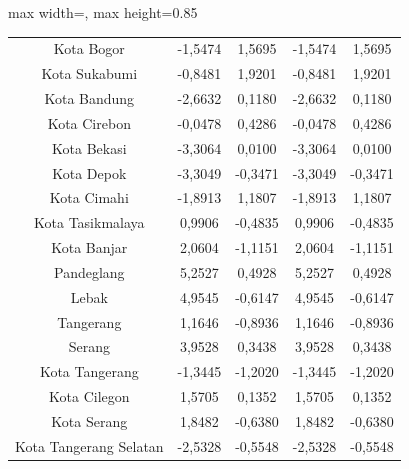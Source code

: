 \begin{table}[H]
\begin{adjustbox}{max width=\textwidth, max height=0.85\textheight}
\begin{tabular}{|c|c|c|c|c|}
Kota Bogor & -1,5474 & 1,5695 & -1,5474 & 1,5695 \\
Kota Sukabumi & -0,8481 & 1,9201 & -0,8481 & 1,9201 \\
Kota Bandung & -2,6632 & 0,1180 & -2,6632 & 0,1180 \\
Kota Cirebon & -0,0478 & 0,4286 & -0,0478 & 0,4286 \\
Kota Bekasi & -3,3064 & 0,0100 & -3,3064 & 0,0100 \\
Kota Depok & -3,3049 & -0,3471 & -3,3049 & -0,3471 \\
Kota Cimahi & -1,8913 & 1,1807 & -1,8913 & 1,1807 \\
Kota Tasikmalaya & 0,9906 & -0,4835 & 0,9906 & -0,4835 \\
Kota Banjar & 2,0604 & -1,1151 & 2,0604 & -1,1151 \\
Pandeglang & 5,2527 & 0,4928 & 5,2527 & 0,4928 \\
Lebak & 4,9545 & -0,6147 & 4,9545 & -0,6147 \\
Tangerang & 1,1646 & -0,8936 & 1,1646 & -0,8936 \\
Serang & 3,9528 & 0,3438 & 3,9528 & 0,3438 \\
Kota Tangerang & -1,3445 & -1,2020 & -1,3445 & -1,2020 \\
Kota Cilegon & 1,5705 & 0,1352 & 1,5705 & 0,1352 \\
Kota Serang & 1,8482 & -0,6380 & 1,8482 & -0,6380 \\
Kota Tangerang Selatan & -2,5328 & -0,5548 & -2,5328 & -0,5548 \\
\hline
\end{tabular}
\end{adjustbox}
\end{table}